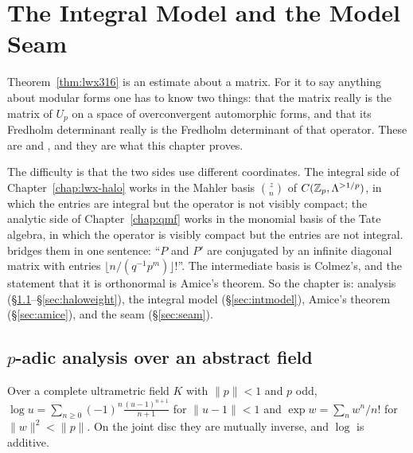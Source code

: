 \chapter{The Integral Model and the Model Seam}
\label{chap:lwx-model}

Theorem~\ref{thm:lwx316} is an estimate about a matrix.  For it to say anything about modular
forms one has to know two things: that the matrix really is the matrix of $U_p$ on a space of
overconvergent automorphic forms, and that its Fredholm determinant really is the Fredholm
determinant of that operator.  These are \cite[Proposition 3.1]{LWX} and
\cite[Proposition 2.17]{LWX}, and they are what this chapter proves.

The difficulty is that the two sides use different coordinates.  The integral side of
Chapter~\ref{chap:lwx-halo} works in the Mahler basis $\binom{z}{n}$ of $C(\mathbb{Z}_p, \Lambda^{>1/p})$, in
which the entries are integral but the operator is not visibly compact; the analytic side of
Chapter~\ref{chap:qmf} works in the monomial basis of the Tate algebra, in which the operator is
visibly compact but the entries are not integral.  \cite[proof of Proposition 2.17]{LWX} bridges
them in one sentence: ``$P$ and $P'$ are conjugated by an infinite diagonal matrix with entries
$\lfloor n/(q^{-1}p^{m})\rfloor!$''.  The intermediate basis is Colmez's, and the statement that
it is orthonormal is Amice's theorem.  So the chapter is: analysis
(\S\ref{sec:explog}--\S\ref{sec:haloweight}), the integral model (\S\ref{sec:intmodel}), Amice's
theorem (\S\ref{sec:amice}), and the seam (\S\ref{sec:seam}).

\section{$p$-adic analysis over an abstract field}
\label{sec:explog}

\begin{definition}
  \label{def:padicexplog}
  \leanok
  Over a complete ultrametric field $K$ with $\lVert p\rVert<1$ and $p$ odd,
  $\log u = \sum_{n\ge0}(-1)^{n}\tfrac{(u-1)^{n+1}}{n+1}$ for $\lVert u-1\rVert<1$ and
  $\exp w = \sum_n w^{n}/n!$ for $\lVert w\rVert^{2}<\lVert p\rVert$.  On the joint disc they are
  mutually inverse, and $\log$ is additive.
\end{definition}

